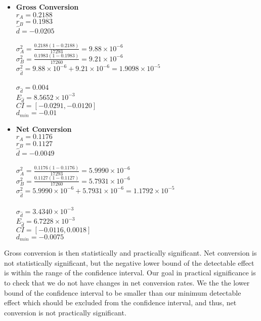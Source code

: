 \documentclass[11pt]{article}
\begin{document}
		\begin{itemize}
			\item \textbf{Gross Conversion} \\
			$r_A = 0.2188$ \\
			$r_B = 0.1983$ \\
			$\hat{d} = -0.0205$ \\
			\\
			$\sigma_{A}^2 = \frac{0.2188(1 - 0.2188)}{17293} = 9.88 \times 10^{-6}$ \\
			$\sigma_{B}^2 = \frac{0.1983(1 - 0.1983)}{17260} = 9.21 \times 10^{-6}$ \\
			$\sigma_{\hat{d}}^2 = 9.88 \times 10^{-6} + 9.21 \times 10^{-6} = 1.9098 \times 10^{-5}$ \\
			\\
			$\sigma_{\hat{d}} = 0.004$ \\
			$E_{\hat{d}} = 8.5652 \times 10^{-3}$ \\
			$CI = [-0.0291, -0.0120]$ \\
			$d_{min} = -0.01$\\
			\item \textbf{Net Conversion} \\
			$r_A = 0.1176$ \\
			$r_B = 0.1127$ \\
			$\hat{d} = -0.0049$ \\
			\\
			$\sigma_{A}^2 = \frac{0.1176(1 - 0.1176)}{17293} = 5.9990 \times 10^{-6}$ \\
			$\sigma_{B}^2 = \frac{0.1127(1 - 0.1127)}{17260} = 5.7931 \times 10^{-6}$ \\
			$\sigma_{\hat{d}}^2 = 5.9990 \times 10^{-6} + 5.7931 \times 10^{-6} = 1.1792 \times 10^{-5}$ \\
			\\
			$\sigma_{\hat{d}} = 3.4340 \times 10^{-3}$ \\
			$E_{\hat{d}} = 6.7228 \times 10^{-3}$ \\
			$CI = [-0.0116, 0.0018]$ \\
			$d_{min} = -0.0075$\\			
		\end{itemize}
		
		Gross conversion is then statistically and practically significant.
		Net conversion is not statistically significant, but the negative lower bound of the detectable effect is within the range of the confidence interval.
		Our goal in practical significance is to check that we do not have changes in net conversion rates.
		We the the lower bound of the confidence interval to be smaller than our minimum detectable effect which should be excluded from the confidence interval, and thus, net conversion is not practically significant.		
\end{document}
